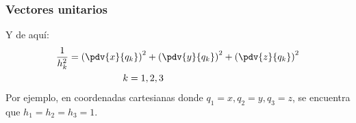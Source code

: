 \begin{frame}
\frametitle{Vectores unitarios}
Y de aquí:
\begin{align}
\begin{aligned}
\dfrac{1}{h_{k}^{2}} &= \left( \pdv{x}{q_{k}} \right)^{2} + \left( \pdv{y}{q_{k}} \right)^{2} + \left( \pdv{z}{q_{k}} \right)^{2}  \\
{}& \hspace{2cm} k = 1, 2, 3
\end{aligned}
\label{eq:ecuacion_A_01_09}
\end{align}
\pause
Por ejemplo, en coordenadas cartesianas donde $q_{1} = x, q_{2} = y, q_{3} = z$, se encuentra que $h_{1} = h_{2} = h_{3} = 1$.
\end{frame}

